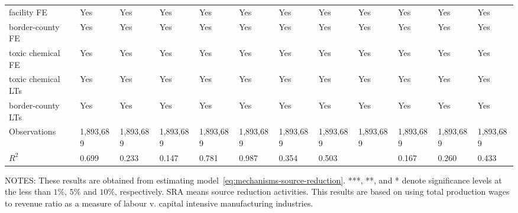 \begin{table}[H]
{\begin{tabular}{@{}llllllllllll@{}}
            facility FE           & Yes       & Yes       & Yes             & Yes        & Yes                   & Yes       & Yes       & Yes                   & Yes                 & Yes                   & Yes                 \\
            border-county FE      & Yes       & Yes       & Yes             & Yes        & Yes                   & Yes       & Yes       & Yes                   & Yes                 & Yes                   & Yes                 \\
            toxic chemical FE     & Yes       & Yes       & Yes             & Yes        & Yes                   & Yes       & Yes       & Yes                   & Yes                 & Yes                   & Yes                 \\
            toxic chemical LTs    & Yes       & Yes       & Yes             & Yes        & Yes                   & Yes       & Yes       & Yes                   & Yes                 & Yes                   & Yes                 \\
            border-county LTs     & Yes       & Yes       & Yes             & Yes        & Yes                   & Yes       & Yes       & Yes                   & Yes                 & Yes                   & Yes                 \\\midrule
            Observations          & 1,893,689 & 1,893,689 & 1,893,689       & 1,893,689  & 1,893,689             & 1,893,689 & 1,893,689 & 1,893,689             & 1,893,689           & 1,893,689             & 1,893,689           \\
            $R^2$                 & 0.699     & 0.233     & 0.147           & 0.781      & 0.987                 & 0.354     & 0.503     &                       & 0.167               & 0.260                 & 0.433               \\ \bottomrule \bottomrule
        \end{tabular}%
    }
    \begin{minipage}{\columnwidth}
        \vspace{0.05in}
        \tiny NOTES: These results are obtained from estimating model~\ref{eq:mechanisms-source-reduction}. ***, **, and * denote significance levels at the less than $1\%$, $5\%$ and $10\%$, respectively. SRA means source reduction activities. This results are based on using total production wages to revenue ratio as a measure of labour v. capital intensive manufacturing industries.
    \end{minipage}
\end{table}